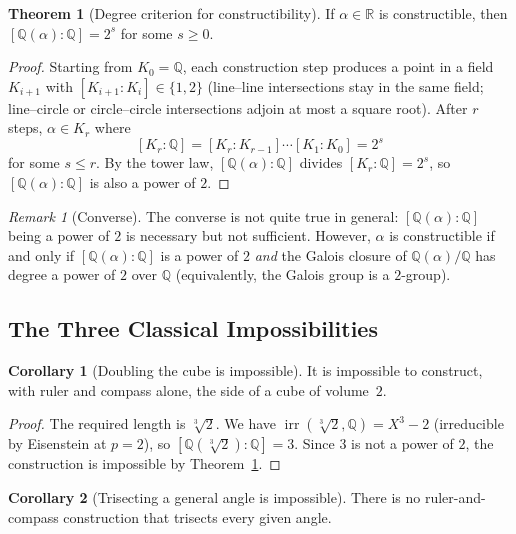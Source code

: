 \documentclass[12pt,a4paper,openany]{book}
\theoremstyle{definition}
\newtheorem{theorem}{Theorem}[chapter]
\newtheorem{corollary}{Corollary}[chapter]
\theoremstyle{remark}
\newtheorem{remark}{Remark}[chapter]
\newcommand{\Q}{\mathbb{Q}}
\newcommand{\R}{\mathbb{R}}
\DeclareMathOperator{\irr}{irr}
\begin{document}
\begin{theorem}[Degree criterion for constructibility]\label{thm:degree-constructible}
If $\alpha\in\R$ is constructible, then $[\Q(\alpha):\Q]=2^{s}$ for some
$s\geq 0$.
\end{theorem}

\begin{proof}
Starting from $K_{0}=\Q$, each construction step produces a point in a
field $K_{i+1}$ with $[K_{i+1}:K_{i}]\in\{1,2\}$ (line--line
intersections stay in the same field; line--circle or circle--circle
intersections adjoin at most a square root).  After $r$ steps,
$\alpha\in K_{r}$ where
\[
  [K_{r}:\Q] = [K_{r}:K_{r-1}]\cdots[K_{1}:K_{0}] = 2^{s}
\]
for some $s\leq r$.  By the tower law, $[\Q(\alpha):\Q]$ divides
$[K_{r}:\Q]=2^{s}$, so $[\Q(\alpha):\Q]$ is also a power of $2$.
\end{proof}

\begin{remark}[Converse]\label{rem:constructible-converse}
The converse is not quite true in general: $[\Q(\alpha):\Q]$ being a power
of $2$ is necessary but not sufficient.  However, $\alpha$ is constructible
if and only if $[\Q(\alpha):\Q]$ is a power of $2$ \emph{and} the Galois
closure of $\Q(\alpha)/\Q$ has degree a power of $2$ over $\Q$ (equivalently,
the Galois group is a $2$-group).
\end{remark}

\subsection{The Three Classical Impossibilities}
\label{subsec:impossibilities}

\begin{corollary}[Doubling the cube is impossible]\label{cor:doubling-cube}
It is impossible to construct, with ruler and compass alone, the side of a
cube of volume~$2$.
\end{corollary}

\begin{proof}
The required length is $\sqrt[3]{2}$.  We have $\irr(\sqrt[3]{2},\Q)=X^{3}-2$
(irreducible by Eisenstein at $p=2$), so $[\Q(\sqrt[3]{2}):\Q]=3$.  Since
$3$ is not a power of $2$, the construction is impossible by
Theorem~\ref{thm:degree-constructible}.
\end{proof}

\begin{corollary}[Trisecting a general angle is impossible]\label{cor:trisecting}
There is no ruler-and-compass construction that trisects every given angle.
\end{corollary}
\end{document}

